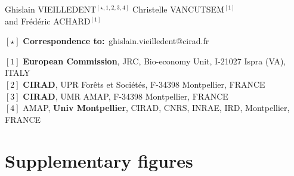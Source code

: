 \documentclass[
  12pt,
]{article}
\begin{document}
\vspace{1cm}

\begin{center}
  \large{
  Ghislain VIEILLEDENT$^{[\star, 1, 2, 3, 4]}$ \hspace{0.5cm} Christelle VANCUTSEM$^{[1]}$\\
  \vspace{0.5cm}
  and \hspace{0.5cm} Frédéric ACHARD$^{[1]}$
  }
\end{center}

\vspace{0.5cm}

\begin{center}
  $[\star]$ \textbf{Correspondence to:}~ghislain.vieilledent@cirad.fr\\
\end{center}

\vspace{0.5cm}

{\small
  \begin{flushleft}
    $[1]$ \textbf{European Commission}, JRC, Bio-economy Unit, I-21027 Ispra (VA), ITALY\\
    $[2]$ \textbf{CIRAD}, UPR Forêts et Sociétés, F-34398 Montpellier, FRANCE\\
    $[3]$ \textbf{CIRAD}, UMR AMAP, F-34398 Montpellier, FRANCE\\
    $[4]$ AMAP, \textbf{Univ Montpellier}, CIRAD, CNRS, INRAE, IRD, Montpellier, FRANCE\\
  \end{flushleft}}

% 
% 
% 
% 
% 

\newpage

\hypertarget{supplementary-figures}{%
\section{Supplementary figures}\label{supplementary-figures}}
\end{document}
